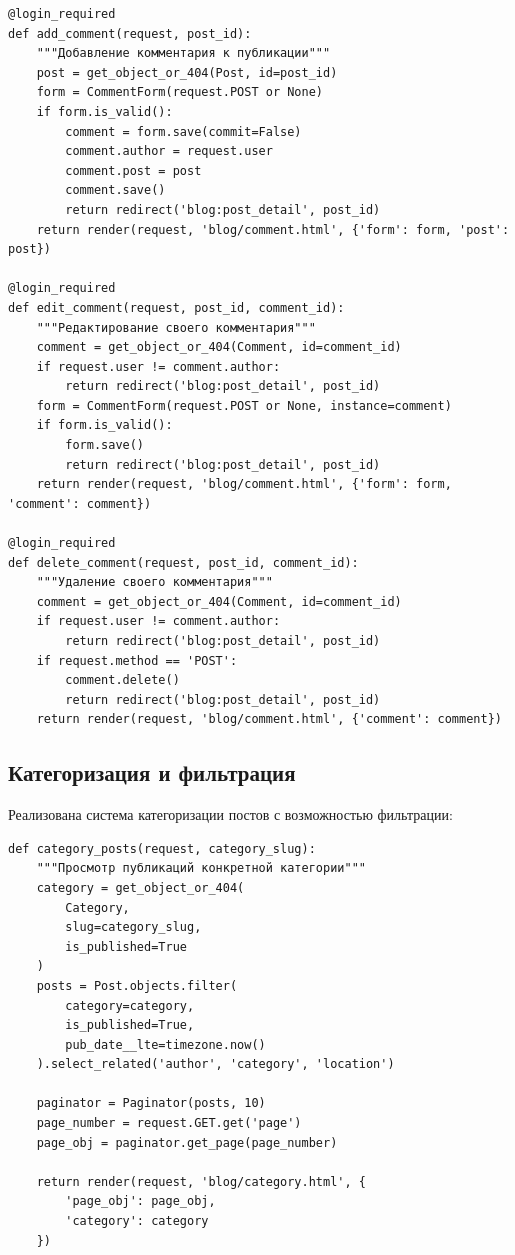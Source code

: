 \documentclass[pract,och,bachelor]{SCWorks}
\begin{document}
\begin{listing}[H]
\begin{verbatim}
@login_required
def add_comment(request, post_id):
    """Добавление комментария к публикации"""
    post = get_object_or_404(Post, id=post_id)
    form = CommentForm(request.POST or None)
    if form.is_valid():
        comment = form.save(commit=False)
        comment.author = request.user
        comment.post = post
        comment.save()
        return redirect('blog:post_detail', post_id)
    return render(request, 'blog/comment.html', {'form': form, 'post': post})

@login_required
def edit_comment(request, post_id, comment_id):
    """Редактирование своего комментария"""
    comment = get_object_or_404(Comment, id=comment_id)
    if request.user != comment.author:
        return redirect('blog:post_detail', post_id)
    form = CommentForm(request.POST or None, instance=comment)
    if form.is_valid():
        form.save()
        return redirect('blog:post_detail', post_id)
    return render(request, 'blog/comment.html', {'form': form, 'comment': comment})

@login_required
def delete_comment(request, post_id, comment_id):
    """Удаление своего комментария"""
    comment = get_object_or_404(Comment, id=comment_id)
    if request.user != comment.author:
        return redirect('blog:post_detail', post_id)
    if request.method == 'POST':
        comment.delete()
        return redirect('blog:post_detail', post_id)
    return render(request, 'blog/comment.html', {'comment': comment})
\end{verbatim}
\caption{Функции для работы с комментариями}
\end{listing}

\subsection{Категоризация и фильтрация}

Реализована система категоризации постов с возможностью фильтрации:

\begin{listing}[H]
\begin{verbatim}
def category_posts(request, category_slug):
    """Просмотр публикаций конкретной категории"""
    category = get_object_or_404(
        Category, 
        slug=category_slug,
        is_published=True
    )
    posts = Post.objects.filter(
        category=category,
        is_published=True,
        pub_date__lte=timezone.now()
    ).select_related('author', 'category', 'location')
    
    paginator = Paginator(posts, 10)
    page_number = request.GET.get('page')
    page_obj = paginator.get_page(page_number)
    
    return render(request, 'blog/category.html', {
        'page_obj': page_obj,
        'category': category
    })
\end{verbatim}
\caption{Фильтрация публикаций по категориям}
\end{listing}
\end{document}
